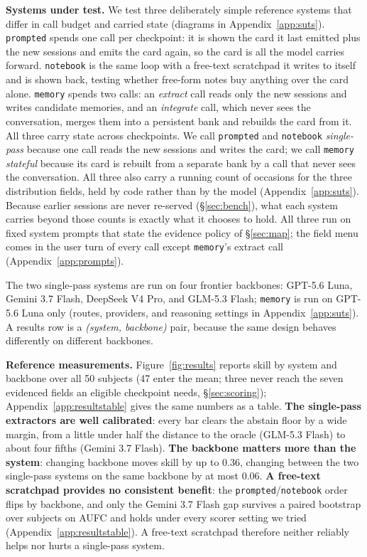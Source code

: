 \documentclass{article}
\begin{document}
\textbf{Systems under test.} We test three deliberately simple reference systems that differ in
call budget and carried state (diagrams in Appendix~\ref{app:suts}).
\texttt{prompted} spends one call per checkpoint: it is shown the card it last emitted plus the new
sessions and emits the card again, so the card is all the model carries forward. \texttt{notebook} is the
same loop with a free-text scratchpad it writes to itself and is shown back, testing whether
free-form notes buy anything over the card alone. \texttt{memory} spends two calls: an
\emph{extract} call reads only the new sessions and writes candidate memories, and an
\emph{integrate} call, which never sees the conversation, merges them into a persistent bank and
rebuilds the card from it. All three carry state across checkpoints. We call \texttt{prompted} and
\texttt{notebook} \emph{single-pass} because one call reads the new sessions and writes the card; we
call \texttt{memory} \emph{stateful} because its card is rebuilt from a separate bank by a call that
never sees the conversation. All three also carry a running count of occasions for the three
distribution fields, held by code rather than by the model (Appendix~\ref{app:suts}). Because earlier
sessions are never re-served (\S\ref{sec:bench}), what each system carries beyond those counts is
exactly what it chooses to hold. All three run on fixed system prompts that state the evidence
policy of \S\ref{sec:map}; the field menu comes in the user turn of every
call except \texttt{memory}'s extract call (Appendix~\ref{app:prompts}).

The two single-pass systems are run on four frontier backbones: GPT-5.6 Luna, Gemini 3.7 Flash, DeepSeek
V4 Pro, and GLM-5.3 Flash; \texttt{memory} is run on GPT-5.6 Luna only (routes, providers, and reasoning settings in
Appendix~\ref{app:suts}). A results row is a
\emph{(system, backbone)} pair, because the same design behaves differently on different
backbones.

\textbf{Reference measurements.} Figure~\ref{fig:results} reports skill by system and backbone over
all 50 subjects (47 enter the mean; three never reach the seven evidenced fields an eligible checkpoint needs,
\S\ref{sec:scoring});
Appendix~\ref{app:resultstable} gives the same numbers as a table. \textbf{The single-pass extractors are well calibrated}: every bar clears the abstain
floor by a wide margin, from a little under half the distance to the oracle (GLM-5.3 Flash) to about four
fifths (Gemini 3.7 Flash). \textbf{The
backbone matters more than the system}: changing backbone moves skill by up to $0.36$, changing
between the two single-pass systems on the same backbone by at most $0.06$. \textbf{A free-text scratchpad provides no consistent benefit}: the \texttt{prompted}/\texttt{notebook}
order flips by backbone, and only the Gemini 3.7 Flash gap survives a paired bootstrap over subjects on AUFC
and holds under every scorer setting we tried (Appendix~\ref{app:resultstable}). A free-text
scratchpad therefore neither reliably helps nor hurts a single-pass system.
\end{document}
